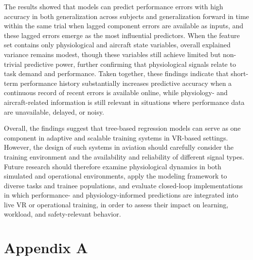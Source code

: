 \documentclass[11pt, a4paper]{article}
\begin{document}
The results showed that models can predict performance errors with high accuracy in both generalization across subjects and generalization forward in time within the same trial when lagged component errors are available as inputs, and these lagged errors emerge as the most influential predictors. When the feature set contains only physiological and aircraft state variables, overall explained variance remains modest, though these variables still achieve limited but non-trivial predictive power, further confirming that physiological signals relate to task demand and performance. Taken together, these findings indicate that short-term performance history substantially increases predictive accuracy when a continuous record of recent errors is available online, while physiology- and aircraft-related information is still relevant in situations where performance data are unavailable, delayed, or noisy.

Overall, the findings suggest that tree-based regression models can serve as one component in adaptive and scalable training systems in VR-based settings. However, the design of such systems in aviation should carefully consider the training environment and the availability and reliability of different signal types. Future research should therefore examine physiological dynamics in both simulated and operational environments, apply the modeling framework to diverse tasks and trainee populations, and evaluate closed-loop implementations in which performance- and physiology-informed predictions are integrated into live VR or operational training, in order to assess their impact on learning, workload, and safety-relevant behavior.




\clearpage
\appendix
{}
\section*{Appendix A} 
\label{app:a}
\end{document}
